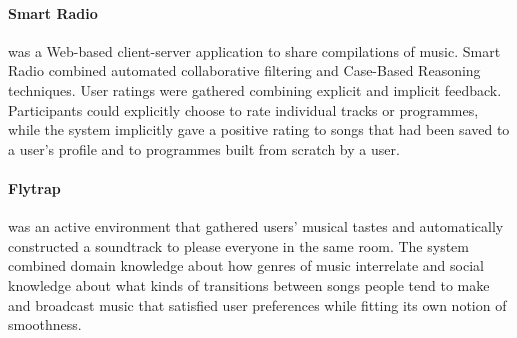 

\paragraph{Smart Radio} %
\label{par:smart_radio}
\cite{Hayes01b} was a Web-based client-server application to share compilations of music.
Smart Radio combined automated collaborative filtering and Case-Based Reasoning techniques.
User ratings were gathered combining explicit and implicit feedback. 
Participants could explicitly choose to rate individual tracks or programmes, while the system implicitly gave a positive rating to songs that had been saved to a user's profile and to programmes built from scratch by a user. %


\paragraph{Flytrap} %
\cite{Crossen02} was an active environment that gathered users' musical tastes and automatically constructed a soundtrack to please everyone in the same room. 
The system combined domain knowledge about how genres of music interrelate and social knowledge about what kinds of transitions between songs people tend to make and broadcast music that satisfied user preferences while fitting its own notion of smoothness.

